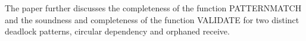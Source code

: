 The paper further discusses the completeness of the function \textrm{PATTERNMATCH} and the soundness and completeness of the function \textrm{VALIDATE} for two distinct deadlock patterns, circular dependency and orphaned receive. 

\begin{comment}
The completeness proof for the abstract machine in \figref{fig:machine} is given in \lemmaref{lemma:complete}.
This proof assumes that the function \textrm{PATTERNMATCH} detects all the instances for a particular pattern. This assumption is proved for the circular dependency pattern and the orphaned receive pattern latter sections. 

\begin{lemma}[Completeness for Feasible Check]
  The machine implementing \textrm{FEASIBLECHECK} is sound for a given pattern instance in that only a program with no deadlock on that instance is accepted; thus, it may reject some programs as having a deadlock on an instance when in fact they do not.
  
  The machine implementing \textrm{FEASIBLECHECK} is sound for a given pattern instance in that it may reject a program as having a deadlock on that instance when in fact it does not.
  
For any single-path MPI program, \textit{ctp}, any feasible schedule for a deadlock pattern instance is demonstrated by the function \textrm{FEASIBLECHECK} in \algoref{algo:main}. 
\label{lemma:complete}
\end{lemma}
\begin{proof}
Proof by showing that the abstract machine in \figref{fig:machine} simulates the message communication under infinite buffer semantics. For the \emph{Sndi Command} and \emph{Rcvi Command} rules, a send or receive is consumed immediately and two structures $\epsnd$ and $\epwait$, respectively, are updated. This is consistent with the issuing of send and receive under infinite buffer semantics. The three cases of \emph{Wait Command} witness the completion of the receives that are not in the pattern $\mathit{pt}$ and intend to get to the receives in $\mathit{pt}$. The two cases of \emph{Barrier Command} block the execution of a member process until all the barriers in the group are witnessed. Since the abstract machine in \figref{fig:machine} is able to simulate the behavior for infinite buffer semantics, any feasible schedule should be demonstrated by executing \textit{ctp} on the machine.
\end{proof}
\end{comment}
